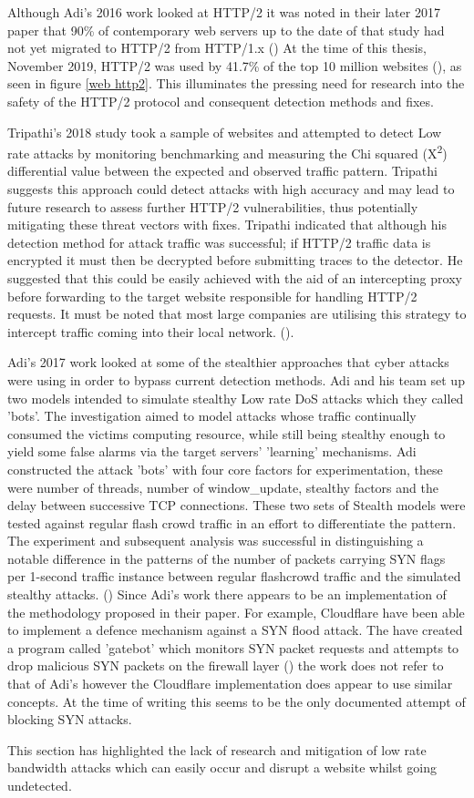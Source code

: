 
Although Adi's 2016 work looked at HTTP/2 it was noted in their later 2017 paper that 90\% of contemporary web servers up to the date of that study had not yet migrated to HTTP/2 from HTTP/1.x (\cite{adi2017stealthy}) At the time of this thesis, November 2019, HTTP/2 was used by 41.7\% of the top 10 million websites (\cite{w3techs}), as seen in figure \ref{web http2}. This illuminates the pressing need for research into the safety of the HTTP/2 protocol and consequent detection methods and fixes. 
 
Tripathi's 2018 study took a sample of websites and attempted to detect Low rate attacks by monitoring benchmarking and measuring the Chi squared (X\textsuperscript{\small2}) differential value between the expected and observed traffic pattern. Tripathi suggests this approach could detect attacks with high accuracy and may lead to future research to assess further HTTP/2 vulnerabilities, thus potentially mitigating these threat vectors with fixes. Tripathi indicated that although his detection method for attack traffic was successful; if HTTP/2 traffic data is encrypted it must then be decrypted before submitting traces to the detector. He suggested that this could be easily achieved with the aid of an intercepting proxy before forwarding to the target website responsible for handling HTTP/2 requests. It must be noted that most large companies are utilising this strategy to intercept traffic coming into their local network. (\cite{tripathi2018slow}). 

Adi's 2017 work looked at some of the stealthier approaches that cyber attacks were using in order to bypass current detection methods. Adi and his team set up two models intended to simulate stealthy Low rate DoS attacks which they called 'bots'. The investigation aimed to model attacks whose traffic continually consumed the victims computing resource, while still being stealthy enough to yield some false alarms via the target servers' 'learning' mechanisms. Adi constructed the attack 'bots' with four core factors for experimentation, these were number of threads, number of window\_update, stealthy factors and the delay between successive TCP connections. These two sets of Stealth models were tested against regular flash crowd traffic in an effort to differentiate the pattern. The experiment and subsequent analysis was successful in distinguishing a notable difference in the patterns of the number of packets carrying SYN flags per 1-second traffic instance between regular flashcrowd traffic and the simulated stealthy attacks. (\cite{adi2017stealthy}) Since Adi's work there appears to be an implementation of the methodology proposed in their paper. For example, Cloudflare have been able to implement a defence mechanism against a SYN flood attack. The have created a program called 'gatebot' which monitors SYN packet requests and attempts to drop malicious SYN packets on the firewall layer (\cite{CFSYN}) the work does not refer to that of Adi's however the Cloudflare implementation does appear to use similar concepts. At the  time of writing this seems to be the only documented attempt of blocking SYN attacks.

This section has highlighted the lack of research and mitigation of low rate bandwidth attacks which can easily occur and disrupt a website whilst going undetected.